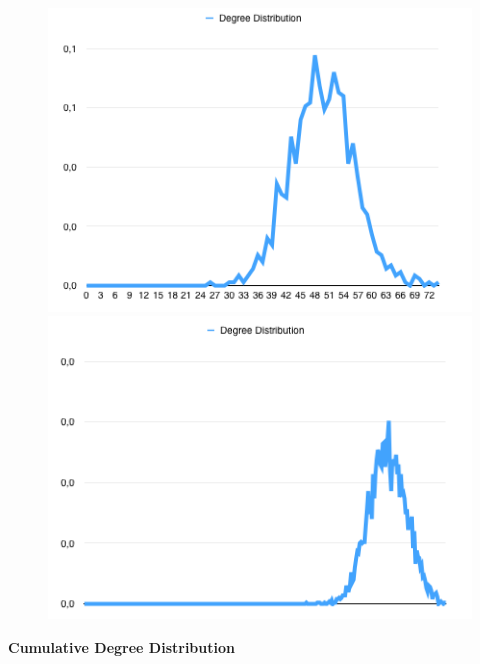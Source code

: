 \documentclass[a4paper,titlepage,11pt]{article}
\begin{document}
\begin{figure}[h]
    \centering
    \includegraphics[scale=0.50]{img/dd-1000-05.png}
    \includegraphics[scale=0.50]{img/dd-5000-05.png}
\end{figure}


\textbf{Cumulative Degree Distribution}
\end{document}

